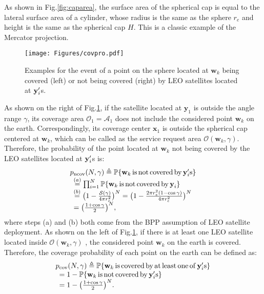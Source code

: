 \documentclass[final]{IEEEtran}
\begin{document}
\indent As shown in Fig.\ref{fig:caparea}, the surface area of the spherical cap is equal to the lateral surface area of a cylinder, whose radius is the same as the sphere $r_e$ and height is the same as the spherical cap $H$. This is a classic example of the Mercator projection.\\
\begin{figure}
    \centering
    \texttt{[image: Figures/covpro.pdf]}
    \caption{Examples for the event of a point on the sphere located at $\textbf{w}_k$ being covered (left) or not being covered (right) by LEO satellites located at $\textbf{y}_i'$s. }
    \label{fig:covpro}
\end{figure}
\indent As shown on the right of Fig.\ref{fig:covpro}, if the satellite located at $\textbf{y}_1$ is outside the angle range $\gamma$, its coverage area $\mathcal{O}_1=\mathcal{A}_1$ does not include the considered point $\textbf{w}_k$ on the earth. Correspondingly, its coverage center $\textbf{x}_1$ is outside the spherical cap centered at $\textbf{w}_k$, which can be called as the service request area $\mathcal{O}(\textbf{w}_k,\gamma)$. Therefore, the probability of the point located at $\textbf{w}_k$ not being covered by the LEO satellites located at $\textbf{y}_i'$s is:
\begin{equation}%
\begin{array}{r@{}l}
    p&_{\rm ncov}(N,\gamma)\triangleq \mathbb{P}\{\textbf{w}_k {\rm\,is\,not\,covered\,by\,}\yi'{\rm s}\}\\
    &\overset{(a)}{=} \prod_{i=1}^{N}\mathbb{P}\{\textbf{w}_k {\rm\,is\,not\,covered\,by\,}\yi\}\\
    &\overset{(b)}{=}\big(1-\frac{\mathcal{S(\gamma)}}{4\pi r_e^2}\big)^{N}=\big(1-\frac{2\pi r_e^2 (1-\cos\gamma)}{4\pi r_e^2}\big)^{N}\\
    &=\big(\frac{1+\cos\gamma}{2}\big)^{N},\\
\end{array}
\end{equation}
where steps (a) and (b) both come from the BPP assumption of LEO satellite deployment. As shown on the left of Fig.\ref{fig:covpro}, if there is at least one LEO satellite located inside $\mathcal{O}(\textbf{w}_k,\gamma)$ , the considered point $\textbf{w}_k$ on the earth is covered. Therefore, the coverage probability of each point on the earth can be defined as:
\begin{equation}
\begin{array}{r@{}l}
    p&_{\rm cov}(N,\gamma)\triangleq \mathbb{P}\{\textbf{w}_k {\rm\,is\,covered\,by\,at\,least\,one\,of\,}\yi'{\rm s}\}\\
    &=1-\mathbb{P}\{\textbf{w}_k {\rm\,is\,not\,covered\,by\,}\yi'{\rm s}\}\\
    &=1-\big(\frac{1+\cos\gamma}{2}\big)^{N}.
\end{array}
\end{equation}
\end{document}
